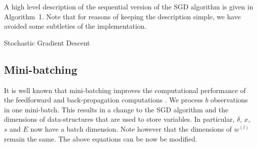 \documentclass{article}
\newcommand{\be}{\begin{equation}}
\newcommand{\ee}{\end{equation}}
\begin{document}
A high level description of the sequential version of the SGD algorithm is given in Algorithm~1. Note that for reasons of keeping the description simple, we have avoided some subtleties of the implementation. 

\begin{algorithm}
\caption{{\sc Stochastic Gradient Descent}}
\label{algo:sequential}

\begin{algorithmic}[1]
\EndFor

	\EndFor
	\EndFor
\EndWhile

\end{algorithmic}
\end{algorithm}



%
%





\subsection{Mini-batching}
It is well known that mini-batching improves the computational performance of the feedforward and back-propagation computations \citep{Shekhar94} .  We process $b$ observations in one mini-batch. This results in a change to the SGD algorithm and the dimensions of data-structures that are used to store variables. In particular, $\delta$, $x$, $s$ and $E$ now have a batch dimension. Note however that the dimensions of $w^{(l)}$ remain the same. The above equations can be now be modified.
\end{document}
